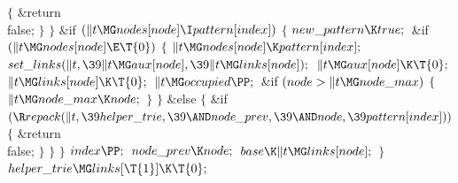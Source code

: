 ${}\{{}$\1\6
\&{return} \\{false};\6
\4${}\}{}$\2\6
\4${}\}{}$\2\6
\&{if} ${}(\|t\MG\\{nodes}[\\{node}]\I\\{pattern}[\\{index}]){}$\5
${}\{{}$\1\6
${}\\{new\_pattern}\K\\{true};{}$\6
\&{if} ${}(\|t\MG\\{nodes}[\\{node}]\E\T{0}){}$\5
${}\{{}$\1\6
${}\|t\MG\\{nodes}[\\{node}]\K\\{pattern}[\\{index}];{}$\6
${}\\{set\_links}(\|t,\39\|t\MG\\{aux}[\\{node}],\39\|t\MG\\{links}[%
\\{node}]);{}$\6
${}\|t\MG\\{aux}[\\{node}]\K\T{0};{}$\6
${}\|t\MG\\{links}[\\{node}]\K\T{0};{}$\6
${}\|t\MG\\{occupied}\PP;{}$\6
\&{if} ${}(\\{node}>\|t\MG\\{node\_max}){}$\5
${}\{{}$\1\6
${}\|t\MG\\{node\_max}\K\\{node};{}$\6
\4${}\}{}$\2\6
\4${}\}{}$\2\6
\&{else}\5
${}\{{}$\1\6
\&{if} ${}(\R\\{repack}(\|t,\39\\{helper\_trie},\39{\AND}\\{node\_prev},\39{%
\AND}\\{node},\39\\{pattern}[\\{index}])){}$\5
${}\{{}$\1\6
\&{return} \\{false};\6
\4${}\}{}$\2\6
\4${}\}{}$\2\6
\4${}\}{}$\2\6
${}\\{index}\PP;{}$\6
${}\\{node\_prev}\K\\{node};{}$\6
${}\\{base}\K\|t\MG\\{links}[\\{node}];{}$\6
\4${}\}{}$\2\6
${}\\{helper\_trie}\MG\\{links}[\T{1}]\K\T{0};{}$\6
